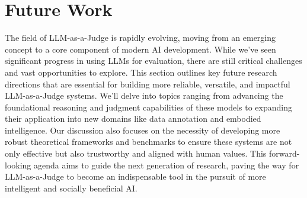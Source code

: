 \documentclass[acmsmall,screen]{acmart}
\begin{document}
\section{Future Work}\label{sec:future_work}
The field of LLM-as-a-Judge is rapidly evolving, moving from an emerging concept to a core component of modern AI development. While we've seen significant progress in using LLMs for evaluation, there are still critical challenges and vast opportunities to explore. This section outlines key future research directions that are essential for building more reliable, versatile, and impactful LLM-as-a-Judge systems. We'll delve into topics ranging from advancing the foundational reasoning and judgment capabilities of these models to expanding their application into new domains like data annotation and embodied intelligence. Our discussion also focuses on the necessity of developing more robust theoretical frameworks and benchmarks to ensure these systems are not only effective but also trustworthy and aligned with human values. This forward-looking agenda aims to guide the next generation of research, paving the way for LLM-as-a-Judge to become an indispensable tool in the pursuit of more intelligent and socially beneficial AI.






\end{document}
